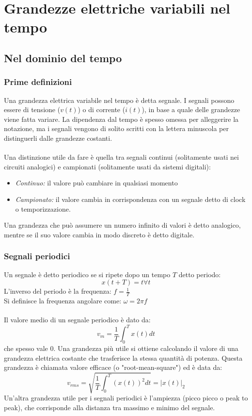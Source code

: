 \documentclass{article}
\begin{document}
\newpage
\section{Grandezze elettriche variabili nel tempo}
\subsection{Nel dominio del tempo}
\subsubsection{Prime definizioni}
Una grandezza elettrica variabile nel tempo è detta segnale. I segnali possono essere di tensione ($v(t)$) o di corrente ($i(t)$), in base a quale delle grandezze viene fatta variare. La dipendenza dal tempo è spesso omessa per alleggerire la notazione, ma i segnali vengono di solito scritti con la lettera minuscola per distinguerli dalle grandezze costanti.\\\\
Una distinzione utile da fare è quella tra segnali continui (solitamente usati nei circuiti analogici) e campionati (solitamente usati da sistemi digitali):
\begin{itemize}
    \item \textit{Continuo:} il valore può cambiare in qualsiasi momento
    \item \textit{Campionato:} il valore cambia in corrispondenza con un segnale detto di clock o temporizzazione.
\end{itemize}
Una grandezza che può assumere un numero infinito di valori è detto analogico, mentre se il suo valore cambia in modo discreto è detto digitale.

\subsubsection{Segnali periodici}
Un segnale è detto periodico se si ripete dopo un tempo $T$ detto periodo:
$$ x(t+T)=t \forall t $$
L'inverso del periodo è la frequenza: $f=\frac{1}{T}$\\
Si definisce la frequenza angolare come: $\omega=2\pi f$\\\\
Il valore medio di un segnale periodico è dato da:
$$ v_m=\frac{1}{T}\int_0^Tx(t)dt $$
che spesso vale 0. Una grandezza più utile si ottiene calcolando il valore di una grandezza elettrica costante che trasferisce la stessa quantità di potenza. Questa grandezza è chiamata valore efficace (o "root-mean-square") ed è data da:
$$ v_{rms} = \sqrt{\frac{1}{T}\int_0^T(x(t))^2dt}=|x(t)|_2$$
Un'altra grandezza utile per i segnali periodici è l'ampiezza (picco picco o peak to peak), che corrisponde alla distanza tra massimo e minimo del segnale.
\end{document}
